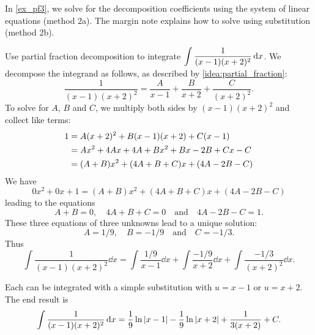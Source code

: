 In \autoref{ex_pf3}, we solve for the decomposition coefficients using the system of linear equations (method 2a). The margin note explains how to solve using substitution (method 2b).

%
\begin{example}\label{ex_pf3}%
Use partial fraction decomposition to integrate $\displaystyle\int\frac{1}{(x-1)(x+2)^2}\operatorname{d}\! x$.
\solution
We decompose the integrand as follows, as described by \autoref{idea:partial_fraction}:
\begin{equation}\label{eq:decomp3}%
 \frac{1}{(x-1)(x+2)^2} = \frac{A}{x-1} + \frac{B}{x+2} + \frac{C}{(x+2)^2}.
\end{equation}
To solve for $A$, $B$ and $C$, we multiply both sides by $(x-1)(x+2)^2$ and collect like terms:
\begin{align}
	1
	&= A(x+2)^2 + B(x-1)(x+2) + C(x-1)\label{eq:pf3}\\
	&= Ax^2+4Ax+4A + Bx^2 + Bx-2B + Cx-C \notag \\
	&= (A+B)x^2 + (4A+B+C)x + (4A-2B-C)\notag
\end{align}
We have
\[0x^2+0x+ 1 = (A+B)x^2 + (4A+B+C)x + (4A-2B-C)\]
leading to the equations 
\[A+B = 0, \quad 4A+B+C = 0 \quad \text{and} \quad 4A-2B-C = 1.\]
These three equations of three unknowns lead to a unique solution:
\[A = 1/9,\quad B = -1/9 \quad \text{and} \quad C = -1/3.\]
Thus 
\[
\int\frac{1}{(x-1)(x+2)^2}\dd x = \int \frac{1/9}{x-1}\dd x + \int \frac{-1/9}{x+2}\dd x + \int \frac{-1/3}{(x+2)^2}\dd x.
\]

Each can be integrated with a simple substitution with $u=x-1$ or $u=x+2$.
The end result is
\[\int\frac{1}{(x-1)(x+2)^2}\operatorname{d}\! x = \frac19\ln\left\lvert x-1 \right\rvert-\frac19\ln\left\lvert x+2 \right\rvert +\frac1{3(x+2)}+C.\]
\end{example}

